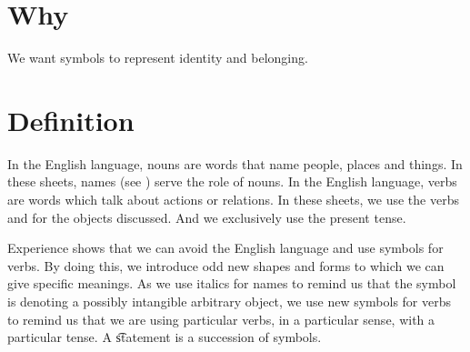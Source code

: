 
\section*{Why}

We want symbols to represent identity and belonging.


\section*{Definition}

In the English language, nouns are words that name people, places and things.
In these sheets, names (see ) serve the role of nouns.
In the English language, verbs are words which talk about actions or relations.
In these sheets, we use the verbs  and  for the objects discussed.
And we exclusively use the present tense.


Experience shows that we can avoid the English language and use symbols for verbs.
By doing this, we introduce odd new shapes and forms to which we can give specific meanings.
As we use italics for names to remind us that the symbol is denoting a possibly intangible arbitrary object, we use new symbols for verbs to remind us that we are using particular verbs, in a particular sense, with a particular tense.
A \t{statement} is a succession of symbols.


